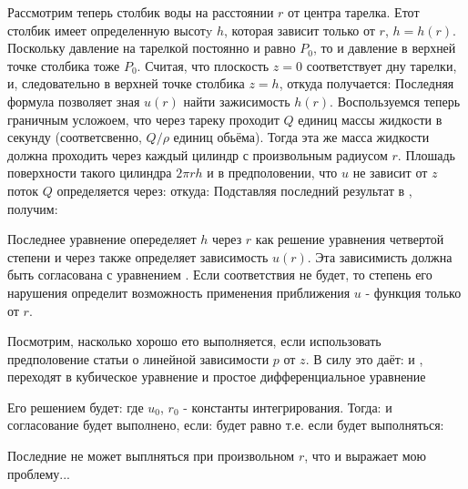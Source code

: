 \documentclass{article}
\begin{document}
\p
Рассмотрим теперь столбик воды на расстоянии $r$ от центра тарелка. Етот столбик имеет определенную высотy $h$, которая зависит только от $r$, $h = h(r)$. Поскольку давление на тарелкой постоянно и равно $P_0$, то и давление в верхней точке столбика тоже $P_0$. Считая, что плоскость $z = 0$ соответствует дну тарелки, и, следовательно в верхней точке столбика $z = h$, откуда получается:
\p
Последняя формула позволяет зная $u(r)$ найти зажисимость $h(r)$. Воспользуемся теперь граничным усложоем, что через тареку проходит $Q$ единиц массы жидкости в секунду (соответсвенно, $Q/\rho$ единиц обьёма). Тогда эта же масса жидкости должна проходить через каждый цилиндр с произвольным радиусом $r$. Плошадь поверхности такого цилиндра $2\pi r h$ и в предполовении, что $u$ не зависит от $z$ поток $Q$ определяется через:
откуда:
\p
Подставляя последний результат в , получим:

Последнее уравнение опеределяет $h$ через $r$ как решение уравнения четвертой степени и через  также определяет зависимость $u(r)$. Эта зависимисть должна быть согласована с уравнением . Если соответствия не будет, то степень его нарушения определит возможность применения приближения $u$ - функция только от $r$. 

\p
Посмотрим, насколько хорошо ето выполняется, если использовать предполовение статьи о линейной зависимости $p$ от $z$. В силу  это даёт:
и ,  переходят в кубическое уравнение
и простое дифференциальное уравнение

\p
Его решением будет:
где $u_0$, $r_0$ - константы интегрирования. Тогда:
и согласование будет выполнено, если:
будет равно
т.е. если будет выполняться:

\p
Последние не может выплняться при произвольном $r$, что и выражает мою проблему...
\end{document}
